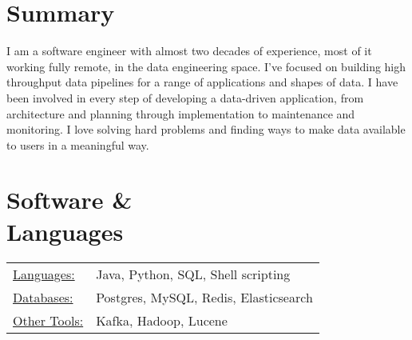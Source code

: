\documentclass[margin]{res}
\begin{document}

\address{Baltimore, MD --- (917) 678 3636 \\
\href{mailto:mark.tozzi@gmail.com}{mark.tozzi@gmail.com}
$\bullet$ \href{https://github.com/not-napoleon}{github: not-napoleon}}


\begin{resume}

\section{Summary}
I am a software engineer with almost two decades of experience, most of it working
fully remote, in the data engineering space.  I've focused on building high
throughput data pipelines for a range of applications and shapes of data.
I have been involved in every step of developing a data-driven application,
from architecture and planning through implementation to maintenance and
monitoring.  I love solving hard problems and finding ways to make data
available to users in a meaningful way.

\section{Software \& \\ Languages}
   \begin{tabular}{l p{3in}}
     \underline{Languages:} & Java, Python, SQL, Shell scripting \\
     \underline{Databases:} & Postgres, MySQL, Redis, Elasticsearch \\
     \underline{Other Tools:} & Kafka, Hadoop, Lucene
   \end{tabular}

\raggedright{}

\end{resume}
\end{document}
